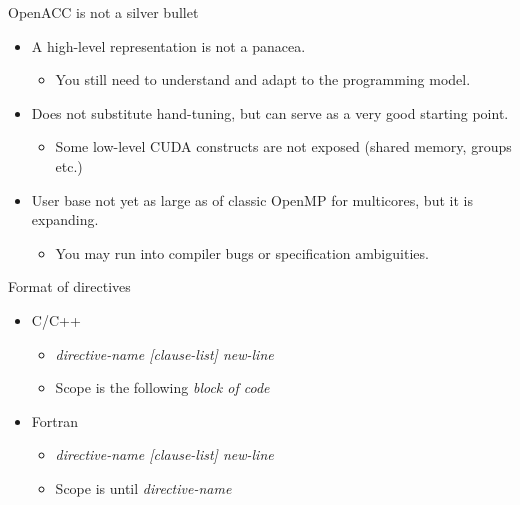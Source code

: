 \documentclass[12pt,aspectratio=169]{beamer}
\begin{document}
\begin{frame}{OpenACC is not a silver bullet}
  \begin{itemize}
  \item A high-level representation is not a panacea.
    \begin{itemize}
    \item You still need to understand and adapt to the programming model.
    \end{itemize}
    \vfill
  \item Does not substitute hand-tuning, but can serve as a very good starting point.
    \begin{itemize}
    \item Some low-level CUDA constructs are not exposed (shared memory, groups etc.)
    \end{itemize}
    \vfill
  \item User base not yet as large as of classic OpenMP for multicores, but it is expanding.
    \begin{itemize}
    \item You may run into compiler bugs or specification ambiguities.
    \end{itemize}
  \end{itemize}
\end{frame}

\begin{frame}[fragile]{Format of directives}
  \begin{itemize}
  \item C/C++
    \begin{itemize}
    \item {} \emph{directive-name [clause-list]
      new-line}
    \item Scope is the following \emph{block of code}
    \end{itemize}
  \item Fortran
    \begin{itemize}
    \item {} \emph{directive-name [clause-list]
      new-line}
    \item Scope is until  \emph{directive-name}
    \end{itemize}
  \end{itemize}
\end{frame}
\end{document}
